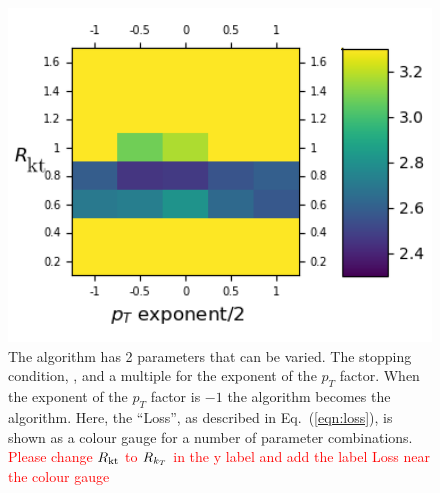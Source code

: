     \begin{figure}[!t]
        \begin{minipage}[c]{0.5\textwidth}
            \includegraphics[width=1\textwidth]{graphics/trangle_scan_genkt.png}
        \end{minipage}\hfill
        \begin{minipage}[c]{0.45\textwidth}
            \caption{The \genkt{} algorithm has 2 parameters that can be varied.
                The stopping condition, \ktstoppingdeltar{}, and a multiple for the exponent of the \(p_T\) factor.
                When the exponent of the \(p_T\) factor is \(-1\) the algorithm becomes the \antikt{} algorithm.
                Here, the ``Loss'', as described in Eq.~(\ref{eqn:loss}), is shown as a colour gauge for a number of parameter combinations.
{\textcolor{red}{Please change $R_{\rm kt}$ to \(R{}_{k_T}\) in the y label and add the label Loss near the colour gauge}}
             }\label{fig:scan_genkt}
        \end{minipage}
    \end{figure}    

